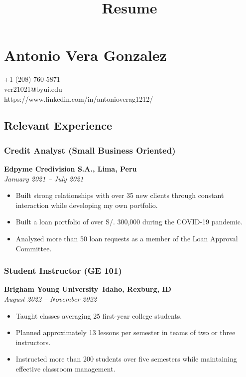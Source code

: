 \documentclass[
  letterpaper,
  DIV=11,
  numbers=noendperiod]{scrartcl}
\title{Resume}
\author{}
\date{}
\providecommand{\tightlist}{%
  \setlength{\itemsep}{0pt}\setlength{\parskip}{0pt}}
\begin{document}
\maketitle


\section{Antonio Vera Gonzalez}\label{antonio-vera-gonzalez}

+1 (208) 760-5871\\
ver21021@byui.edu\\
https://www.linkedin.com/in/antonioverag1212/

\subsection{Relevant Experience}\label{relevant-experience}

\subsubsection{Credit Analyst (Small Business
Oriented)}\label{credit-analyst-small-business-oriented}

\textbf{Edpyme Credivision S.A., Lima, Peru}\\
\emph{January 2021 -- July 2021}

\begin{itemize}
\tightlist
\item
  Built strong relationships with over 35 new clients through constant
  interaction while developing my own portfolio.
\item
  Built a loan portfolio of over S/. 300,000 during the COVID-19
  pandemic.
\item
  Analyzed more than 50 loan requests as a member of the Loan Approval
  Committee.
\end{itemize}

\subsubsection{Student Instructor (GE
101)}\label{student-instructor-ge-101}

\textbf{Brigham Young University--Idaho, Rexburg, ID}\\
\emph{August 2022 -- November 2022}

\begin{itemize}
\tightlist
\item
  Taught classes averaging 25 first-year college students.
\item
  Planned approximately 13 lessons per semester in teams of two or three
  instructors.
\item
  Instructed more than 200 students over five semesters while
  maintaining effective classroom management.
\end{itemize}
\end{document}
